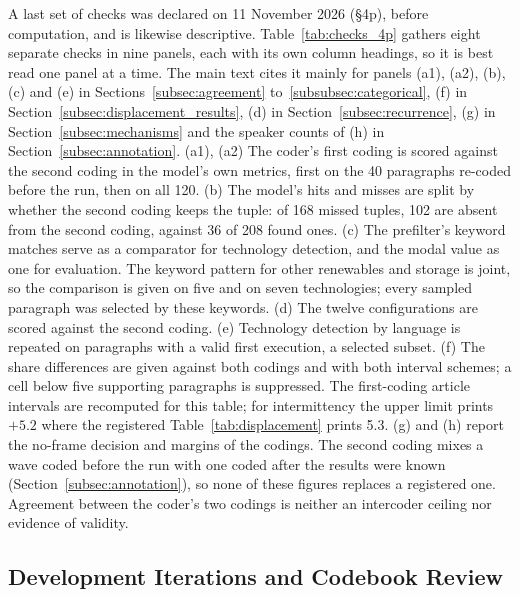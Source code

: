 \appkeepheads\appout

A last set of checks was declared on 11 November 2026 (\S4p), before computation, and is likewise descriptive. Table~\ref{tab:checks_4p} gathers eight separate checks in nine panels, each with its own column headings, so it is best read one panel at a time. The main text cites it mainly for panels (a1), (a2), (b), (c) and (e) in Sections~\ref{subsec:agreement} to~\ref{subsubsec:categorical}, (f) in Section~\ref{subsec:displacement_results}, (d) in Section~\ref{subsec:recurrence}, (g) in Section~\ref{subsec:mechanisms} and the speaker counts of (h) in Section~\ref{subsec:annotation}. (a1), (a2) The coder's first coding is scored against the second coding in the model's own metrics, first on the 40 paragraphs re-coded before the run, then on all 120. (b) The model's hits and misses are split by whether the second coding keeps the tuple: of 168 missed tuples, 102 are absent from the second coding, against 36 of 208 found ones. (c) The prefilter's keyword matches serve as a comparator for technology detection, and the modal value as one for evaluation. The keyword pattern for other renewables and storage is joint, so the comparison is given on five and on seven technologies; every sampled paragraph was selected by these keywords. (d) The twelve configurations are scored against the second coding. (e) Technology detection by language is repeated on paragraphs with a valid first execution, a selected subset. (f) The share differences are given against both codings and with both interval schemes; a cell below five supporting paragraphs is suppressed. The first-coding article intervals are recomputed for this table; for intermittency the upper limit prints $+5.2$ where the registered Table~\ref{tab:displacement} prints 5.3. (g) and (h) report the no-frame decision and margins of the codings. The second coding mixes a wave coded before the run with one coded after the results were known (Section~\ref{subsec:annotation}), so none of these figures replaces a registered one. Agreement between the coder's two codings is neither an intercoder ceiling nor evidence of validity.

\appkeepheads\appout

\subsection{Development Iterations and Codebook Review}\label{app:development}\label{app:codebook_review}

